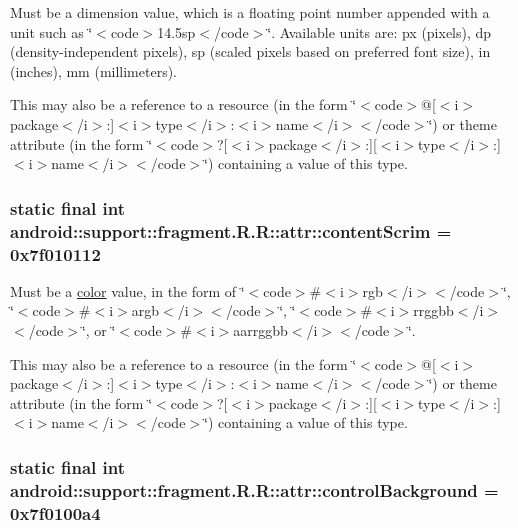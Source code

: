 Must be a dimension value, which is a floating point number appended with a unit such as \char`\"{}$<$code$>$14.5sp$<$/code$>$\char`\"{}. Available units are: px (pixels), dp (density-independent pixels), sp (scaled pixels based on preferred font size), in (inches), mm (millimeters). 

This may also be a reference to a resource (in the form \char`\"{}$<$code$>$@\mbox{[}$<$i$>$package$<$/i$>$:\mbox{]}$<$i$>$type$<$/i$>$:$<$i$>$name$<$/i$>$$<$/code$>$\char`\"{}) or theme attribute (in the form \char`\"{}$<$code$>$?\mbox{[}$<$i$>$package$<$/i$>$:\mbox{]}\mbox{[}$<$i$>$type$<$/i$>$:\mbox{]}$<$i$>$name$<$/i$>$$<$/code$>$\char`\"{}) containing a value of this type. \hypertarget{classandroid_1_1support_1_1fragment_1_1_r_1_1attr_328fdaa2c19e06cdb41475a08254b98e}{
\subsubsection[{contentScrim}]{\setlength{\rightskip}{0pt plus 5cm}static final int android::support::fragment.R.R::attr::contentScrim = 0x7f010112}}
\label{classandroid_1_1support_1_1fragment_1_1_r_1_1attr_328fdaa2c19e06cdb41475a08254b98e}


Must be a \hyperlink{classandroid_1_1support_1_1fragment_1_1_r_1_1color}{color} value, in the form of \char`\"{}$<$code$>$\#$<$i$>$rgb$<$/i$>$$<$/code$>$\char`\"{}, \char`\"{}$<$code$>$\#$<$i$>$argb$<$/i$>$$<$/code$>$\char`\"{}, \char`\"{}$<$code$>$\#$<$i$>$rrggbb$<$/i$>$$<$/code$>$\char`\"{}, or \char`\"{}$<$code$>$\#$<$i$>$aarrggbb$<$/i$>$$<$/code$>$\char`\"{}. 

This may also be a reference to a resource (in the form \char`\"{}$<$code$>$@\mbox{[}$<$i$>$package$<$/i$>$:\mbox{]}$<$i$>$type$<$/i$>$:$<$i$>$name$<$/i$>$$<$/code$>$\char`\"{}) or theme attribute (in the form \char`\"{}$<$code$>$?\mbox{[}$<$i$>$package$<$/i$>$:\mbox{]}\mbox{[}$<$i$>$type$<$/i$>$:\mbox{]}$<$i$>$name$<$/i$>$$<$/code$>$\char`\"{}) containing a value of this type. \hypertarget{classandroid_1_1support_1_1fragment_1_1_r_1_1attr_f2df7d055f292bd351669c4c0a4b75a9}{
\subsubsection[{controlBackground}]{\setlength{\rightskip}{0pt plus 5cm}static final int android::support::fragment.R.R::attr::controlBackground = 0x7f0100a4}}
\label{classandroid_1_1support_1_1fragment_1_1_r_1_1attr_f2df7d055f292bd351669c4c0a4b75a9}


